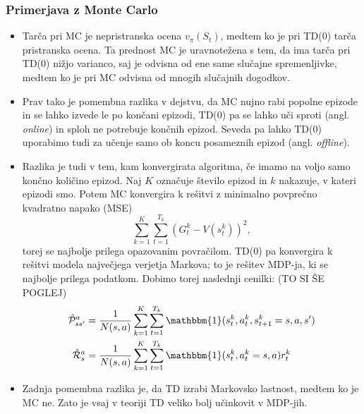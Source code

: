 \documentclass[12pt,a4paper]{amsart}
\theoremstyle{definition} %
\theoremstyle{plain} %
\begin{document}
\subsubsection{Primerjava z Monte Carlo}
\begin{itemize}
    \item Tarča pri MC je nepristranska ocena $v_\pi(S_t)$, medtem ko je pri TD($0$) tarča 
    pristranska ocena. Ta prednost MC je uravnotežena s tem, da ima tarča pri TD($0$) nižjo varianco, 
    saj je odvisna od ene same slučajne spremenljivke, medtem ko je pri MC odvisna od mnogih 
    slučajnih dogodkov.
    
    \item Prav tako je pomembna razlika v dejstvu, da MC nujno rabi popolne epizode in se lahko
    izvede le po končani epizodi, TD($0$) pa se lahko uči sproti (angl. \textit{online}) in sploh 
    ne potrebuje končnih epizod. Seveda pa lahko TD($0$) uporabimo tudi za učenje samo ob koncu 
    posameznih epizod (angl. \textit{offline}).

    \item Razlika je tudi v tem, kam konvergirata algoritma, če imamo na voljo samo končno 
    količino epizod. Naj $K$ označuje število epizod in $k$ nakazuje, v kateri epizodi smo. Potem 
    MC konvergira k rešitvi z minimalno povprečno kvadratno napako (MSE) 
    $$
    \sum_{k=1}^K \sum_{t=1}^{T_k} (G_t^k - V(s_t^k))^2,
    $$
    torej se najbolje prilega opazovanim povračilom. TD($0$) pa konvergira k rešitvi modela največjega 
    verjetja Markova; to je rešitev MDP-ja, ki se najbolje prilega podatkom. Dobimo torej naslednji 
    cenilki: (TO SI ŠE POGLEJ)
    \begin{align*}
        \hat{\mathcal{P}}_{ss'}^a &= \frac{1}{N(s, a)} \sum_{k=1}^K \sum_{t=1}^{T_k} 
                \mathbbm{1}(s_t^k, a_t^k, s_{t+1}^k = s, a, s') \\
        \hat{\mathcal{R}}_{s}^a &= \frac{1}{N(s, a)} \sum_{k=1}^K \sum_{t=1}^{T_k} 
                \mathbbm{1}(s_t^k, a_t^k = s, a)r_t^k
    \end{align*}

    \item Zadnja pomembna razlika je, da TD izrabi Markovsko lastnost, medtem ko je MC ne. Zato je 
    vsaj v teoriji TD veliko bolj učinkovit v MDP-jih.
\end{itemize}
\end{document}
